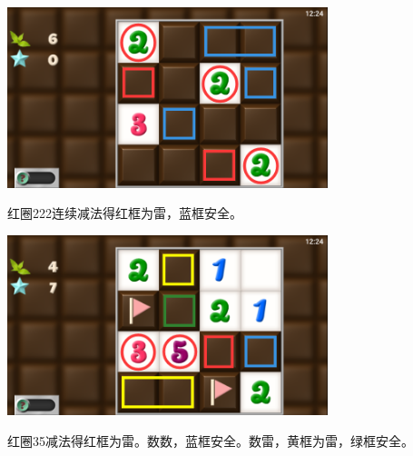 \subsection{} %
\begin{center}
    \includegraphics[width=0.7\textwidth]{puzzle/83-1.png}
\end{center}
红圈222连续减法得红框为雷，蓝框安全。
\begin{center}
    \includegraphics[width=0.7\textwidth]{puzzle/83-2.png}
\end{center}
红圈35减法得红框为雷。数数，蓝框安全。数雷，黄框为雷，绿框安全。

